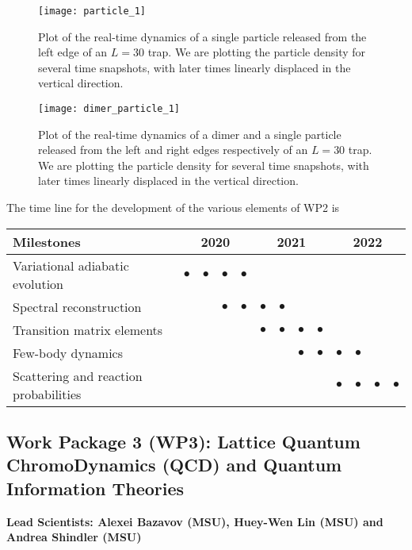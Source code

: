 \documentclass[10pt]{article}
\begin{document}
\begin{figure}
\centering
\texttt{[image: particle\_1]}
\caption{Plot of the real-time dynamics of a single particle released from the left edge of an $L=30$ trap.  We are plotting the particle density for several time snapshots, with later times linearly displaced in the vertical direction.}
\label{particle}
\end{figure}
 
\begin{figure}
\centering
\texttt{[image: dimer\_particle\_1]}
\caption{Plot of the real-time dynamics of a dimer and a single particle released from the left and right edges respectively of an $L=30$ trap.  We are plotting the particle density for
several time snapshots, with later times linearly displaced in the vertical
direction.}
\label{dimer_particle}
\end{figure}

 The time line for the development of the various elements of WP2 is
\begin{footnotesize}
\begin{center}
\begin{tabular}{|l|c|c|c|c|c|c|c|c|c|c|c|c|}
\hline
\multicolumn{1}{|l}{Milestones } & \multicolumn{4}{|c|}{ 2020 } & \multicolumn{4}{c|}{ 2021 } & \multicolumn{4}{c|}{ 2022 } \\
\hline
Variational adiabatic evolution &$\bullet$ &$\bullet$ &$\bullet$ &$\bullet$ & & & & & & & &  \\
\hline
Spectral reconstruction & & & $\bullet$ &$\bullet$ &$\bullet$ &$\bullet$ & & & & & &  \\
\hline
Transition matrix elements & & & & & $\bullet$ &$\bullet$ &$\bullet$ &$\bullet$ & & & &   \\
\hline
Few-body dynamics & & & & & & & $\bullet$ &$\bullet$ &$\bullet$ &$\bullet$ & &\\
\hline
Scattering and reaction probabilities & & & & & & & & & $\bullet$ &$\bullet$ &$\bullet$ &$\bullet$ \\
\hline

\end{tabular}
\end{center}
\end{footnotesize}

\subsection{Work Package 3 (WP3): Lattice Quantum ChromoDynamics (QCD) and Quantum Information Theories}
{\bf Lead Scientists: Alexei Bazavov (MSU), Huey-Wen Lin (MSU) and Andrea Shindler (MSU)}
\end{document}
